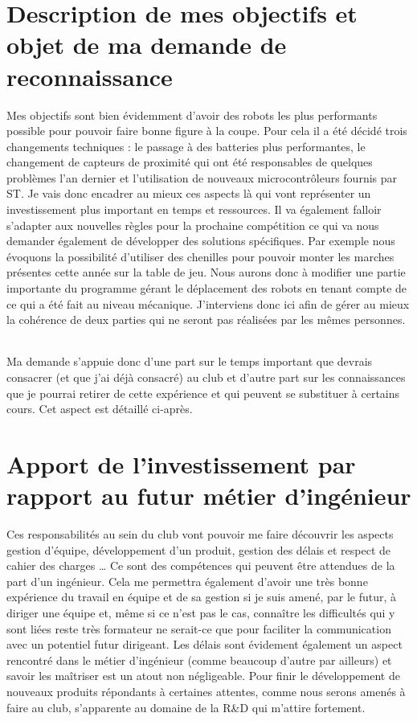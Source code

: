 \documentclass[12pt,a4paper]{article}
\begin{document}
\part{Description de mes objectifs et objet de ma demande de reconnaissance}
Mes objectifs sont bien évidemment d'avoir des robots les plus performants possible pour pouvoir faire bonne figure à la coupe. Pour cela il a été décidé trois changements techniques : le passage à des batteries plus performantes, le changement de capteurs de proximité qui ont été responsables de quelques problèmes l'an dernier et l'utilisation de nouveaux microcontrôleurs fournis par ST. Je vais donc encadrer au mieux ces aspects là qui vont représenter un investissement plus important en temps et ressources. Il va également falloir s’adapter aux nouvelles règles pour la prochaine compétition ce qui va nous demander également de développer des solutions spécifiques. Par exemple nous évoquons  la possibilité d'utiliser des chenilles pour pouvoir monter les marches présentes cette année sur la table de jeu. Nous aurons donc à modifier une partie importante du programme gérant le déplacement des robots en tenant compte de ce qui a été fait au niveau mécanique.  J’interviens donc ici afin de gérer au mieux la cohérence de deux parties qui ne seront pas réalisées par les mêmes personnes.
\paragraph{} Ma demande s'appuie donc d'une part sur le temps important que devrais consacrer (et que j'ai déjà consacré) au club et d'autre part sur les connaissances que je pourrai retirer de cette expérience et qui peuvent se substituer à certains cours. Cet aspect est détaillé ci-après.
\part{Apport de l'investissement par rapport au futur métier d'ingénieur}
Ces responsabilités au sein du club vont pouvoir me faire découvrir les aspects gestion d'équipe, développement d'un produit, gestion des délais et respect de cahier des charges … Ce sont des compétences qui peuvent être attendues de la part d'un ingénieur. Cela me permettra également d'avoir une très bonne expérience du travail en équipe et de sa gestion si je suis amené, par le futur, à diriger une équipe et, même si ce n'est pas le cas, connaître les difficultés qui y sont liées reste très formateur ne serait-ce que pour faciliter la communication avec un potentiel futur dirigeant. Les délais sont évidement également un aspect rencontré dans le métier d'ingénieur (comme beaucoup d'autre par ailleurs) et savoir les maîtriser est un atout non négligeable. Pour finir le développement de nouveaux produits répondants à certaines attentes,  comme nous serons amenés à faire au club, s'apparente au domaine de la R\&D qui m'attire fortement.
\end{document}
